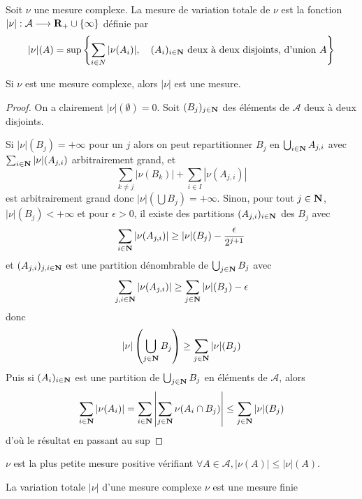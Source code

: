 \begin{dfn}
    Soit $\nu$ une mesure complexe. La mesure de variation totale de  $\nu$  est la fonction  $|\nu|:\mathcal  A \longrightarrow \mathbf R_+\cup \left\{ \infty \right\} $ définie par \[
        |\nu|(A) = \sup \left\{ \sum_{i \in  N}|\nu(A_i)|, \quad  (A_i)_{i \in  \mathbf N} \text{ deux à deux disjoints, d'union } A\right\} 
    \] 
\end{dfn}

\begin{prop}
Si $\nu$ est une mesure complexe, alors  $|\nu|$ est une mesure.
\end{prop}

\begin{proof}
    On a clairement $|\nu|(\emptyset)=0$. Soit  $(B_j)_{j \in  \mathbf N}$ des éléments de $\mathcal  A$ deux à deux disjoints.

    Si $|\nu|(B_j)=+\infty$ pour un  $j$ alors on peut repartitionner  $B_j$ en  $\bigcup_{i \in  \mathbf N} A_{j,i}$ avec $\sum_{i \in  \mathbf N}|\nu|(A_{j,i})$ arbitrairement grand, et \[
        \sum_{k\neq j}|\nu(B_k)| + \sum_{i \in  I}|\nu(A_{j,i})|
    \] 
    est arbitrairement grand donc $|\nu|(\bigcup B_j)=+\infty$. Sinon,  pour tout $j \in  \mathbf N$, $|\nu|(B_j)<+\infty$ et pour  $\epsilon>0$, il existe des partitions $(A_{j,i}) _{i \in  \mathbf N}$ des $B_j$ avec  \[
        \sum_{i \in  \mathbf N}|\nu(A_{j, i})| \geq |\nu|(B_j)-\frac\epsilon{2^{j+1}}
    \] 
    et $(A_{j,i})_{j,i \in  \mathbf N}$ est une partition dénombrable de $\bigcup_{j \in  \mathbf N}B_j$ avec \[
        \sum_{j, i \in  \mathbf N}|\nu(A_{j,i})|\geq \sum_{j \in  \mathbf N}|\nu|(B_j)-\epsilon
    \] 
    donc \[
        |\nu| \left(\bigcup_{j \in  \mathbf N}B_j\right)\geq \sum_{j \in  \mathbf N}|\nu|(B_j)
    \] 
    Puis si $(A_i)_{i \in  \mathbf N}$ est une partition de $\bigcup_{j \in  \mathbf N}B_j$ en éléments de $\mathcal  A$, alors \[
        \sum_{i \in  \mathbf N}|\nu(A_i)|=\sum_{i \in  \mathbf N}\left|\sum_{j \in  \mathbf N}\nu(A_i\cap B_j)\right|\leq \sum_{j \in  \mathbf N}|\nu|(B_j)
    \] 
    d'où le résultat en passant au sup
\end{proof}

\begin{rem}
    $\nu$ est la plus petite mesure positive vérifiant  $\forall  A \in  \mathcal  A, |\nu(A)|\leq |\nu|(A)$.
\end{rem}

\begin{thm}
La variation totale $|\nu|$ d'une mesure complexe $\nu$ est une mesure finie
\end{thm}

